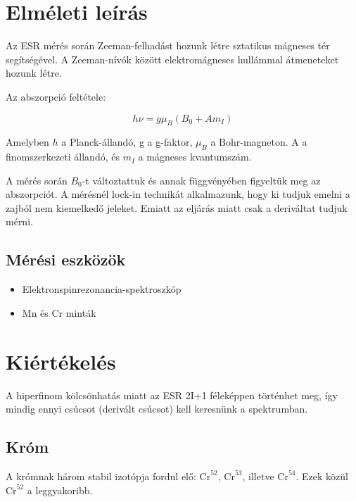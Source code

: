 \documentclass[12pt,a4paper]{article}
\theoremstyle{plain}
\begin{document}
\section{Elméleti leírás}

\par Az ESR mérés során Zeeman-felhadást hozunk létre
sztatikus mágneses tér segítségével. A Zeeman-nívók
között elektromágneses hullámmal átmeneteket hozunk létre.

\par Az abszorpció feltétele:

\begin{equation}
    h \nu = g \mu_{B}(B_0 + A m_I)
\end{equation}

\par Amelyben $h$ a Planck-állandó, g a g-faktor,
$\mu_B$ a Bohr-magneton.
A a finomszerkezeti állandó,
és $m_I$ a mágneses kvantumszám.

\par A mérés során $B_0$-t változtattuk és annak függvényében
figyeltük meg az abszorpciót. A mérésnél lock-in technikát
alkalmazunk, hogy ki tudjuk emelni a zajból nem kiemelkedő
jeleket. Emiatt az eljárás miatt csak a deriváltat tudjuk mérni.

\subsection{Mérési eszközök}

\begin{itemize}
    \item Elektronspinrezonancia-spektroszkóp
    \item \textrm{Mn} és \textrm{Cr} minták
\end{itemize}

\section{Kiértékelés}

\par A hiperfinom kölcsönhatás miatt az ESR 2I+1 féleképpen
történhet meg, így mindig ennyi csúcsot (derivált csúcsot)
kell keresnünk a spektrumban.

\subsection{Króm}

\par A krómnak három stabil izotópja fordul elő:
$\textrm{Cr}^{52}$, $\textrm{Cr}^{53}$, illetve
$\textrm{Cr}^{54}$. Ezek közül $\textrm{Cr}^{52}$ a
leggyakoribb.
\end{document}
